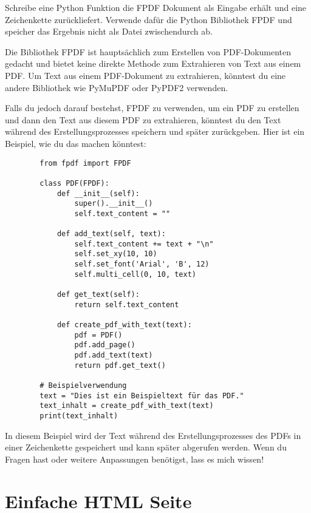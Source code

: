 \newpage

\begin{tcolorbox}[
	enhanced,
	colback=BhtColorYellow!5!white,
	colframe=BhtColorYellow!75!black,
	title= Python Funktion
	]
	Schreibe eine Python Funktion die FPDF Dokument als Eingabe erhält und eine Zeichenkette zurückliefert. Verwende dafür die Python Bibliothek FPDF und speicher das Ergebnis nicht als Datei zwischendurch ab.
\end{tcolorbox}

\begin{tcolorbox}[
	enhanced,
	breakable,
	colback=BhtGrey!5!white,
	colframe=BhtGrey!75!black!50,
	title= Copilot
	]
	Die Bibliothek FPDF ist hauptsächlich zum Erstellen von PDF-Dokumenten gedacht und bietet keine direkte Methode zum Extrahieren von Text aus einem PDF. Um Text aus einem PDF-Dokument zu extrahieren, könntest du eine andere Bibliothek wie PyMuPDF oder PyPDF2 verwenden.
	
	Falls du jedoch darauf bestehst, FPDF zu verwenden, um ein PDF zu erstellen und dann den Text aus diesem PDF zu extrahieren, könntest du den Text während des Erstellungsprozesses speichern und später zurückgeben. Hier ist ein Beispiel, wie du das machen könntest:
	\begin{verbatim}
		from fpdf import FPDF
		
		class PDF(FPDF):
		    def __init__(self):
		        super().__init__()
		        self.text_content = ""
		
		    def add_text(self, text):
		        self.text_content += text + "\n"
		        self.set_xy(10, 10)
		        self.set_font('Arial', 'B', 12)
		        self.multi_cell(0, 10, text)
		
		    def get_text(self):
		        return self.text_content
		
		    def create_pdf_with_text(text):
		        pdf = PDF()
		        pdf.add_page()
		        pdf.add_text(text)
		        return pdf.get_text()
		
		# Beispielverwendung
		text = "Dies ist ein Beispieltext für das PDF."
		text_inhalt = create_pdf_with_text(text)
		print(text_inhalt)
	\end{verbatim}
	In diesem Beispiel wird der Text während des Erstellungsprozesses des PDFs in einer Zeichenkette gespeichert und kann später abgerufen werden. Wenn du Fragen hast oder weitere Anpassungen benötigst, lass es mich wissen!
\end{tcolorbox}

\section{Einfache HTML Seite}
